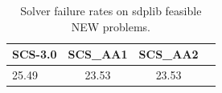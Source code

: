 \begin{table}
\centering
\caption{Solver failure rates on sdplib feasible NEW problems.}
\label{t-sdplib feasible NEW-failure}
\begin{tabular}{lccc}
\toprule
 SCS-3.0 &  SCS\_AA1 &  SCS\_AA2 \\
\midrule
   25.49 &    23.53 &    23.53 \\
\bottomrule
\end{tabular}
\end{table}
